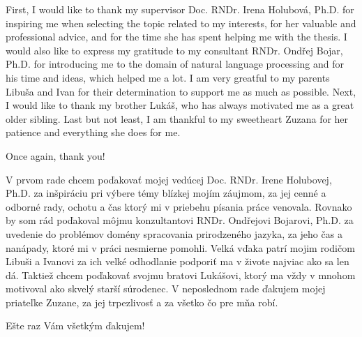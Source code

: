 
First, I would like to thank my supervisor Doc. RNDr. Irena Holubová, Ph.D. for inspiring me when selecting the topic related to my interests, for her valuable and professional advice, and for the time she has spent helping me with the thesis. I would also like to express my gratitude to my consultant RNDr. Ondřej Bojar, Ph.D. for introducing me to the domain of natural language processing and for his time and ideas, which helped me a lot. I am very greatful to my parents Libuša and Ivan for their determination to support me as much as possible. Next, I would like to thank my brother Lukáš, who has always motivated me as a great older sibling. Last but not least, I am thankful to my sweetheart Zuzana for her patience and everything she does for me. 

Once again, thank you!

\frenchspacing
\vspace{1em}

V prvom rade chcem poďakovať mojej vedúcej Doc. RNDr. Irene Holubovej, Ph.D. za inšpiráciu pri výbere témy blízkej mojím záujmom, za jej cenné a odborné rady, ochotu a čas ktorý mi v priebehu písania práce venovala. Rovnako by som rád poďakoval môjmu konzultantovi RNDr. Ondřejovi Bojarovi, Ph.D. za uvedenie do problémov domény spracovania prirodzeného jazyka, za jeho čas a nanápady, ktoré mi v práci nesmierne pomohli. Velká vďaka patrí mojim rodičom Libuši a Ivanovi za ich velké odhodlanie podporiť ma v živote najviac ako sa len dá. Taktiež chcem poďakovať svojmu bratovi Lukášovi, ktorý ma vždy v mnohom motivoval ako skvelý starší súrodenec. V neposlednom rade ďakujem mojej priateľke Zuzane, za jej trpezlivosť a za všetko čo pre mňa robí.

Ešte raz Vám všetkým ďakujem!

\nonfrenchspacing
